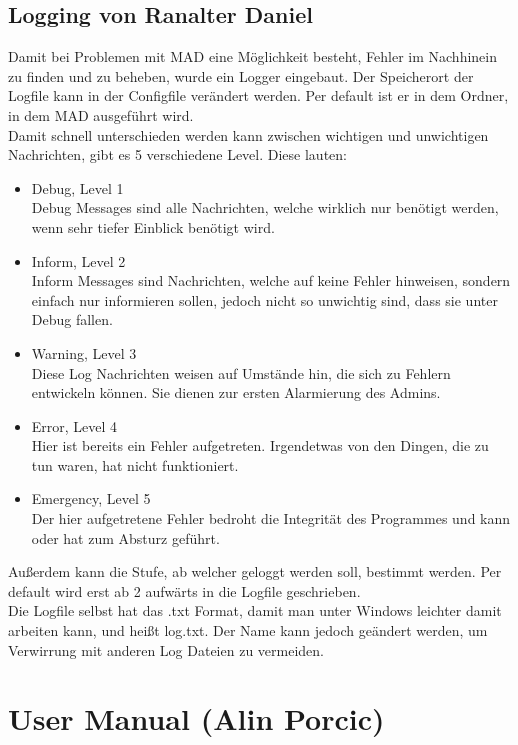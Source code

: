 \documentclass[12pt,a4paper]{report}
\begin{document}
\begin{onehalfspace}

\chapter{Logging von Ranalter Daniel}
Damit bei Problemen mit MAD eine Möglichkeit besteht, Fehler im Nachhinein zu finden und zu beheben, wurde ein Logger eingebaut. Der Speicherort der Logfile kann in der Configfile verändert werden. Per default ist er in dem Ordner, in dem MAD ausgeführt wird.\\
Damit schnell unterschieden werden kann zwischen wichtigen und unwichtigen Nachrichten, gibt es 5 verschiedene \glqq Level\grqq . Diese lauten:
\begin{itemize}
\item Debug, Level 1\\
Debug Messages sind alle Nachrichten, welche wirklich nur benötigt werden, wenn sehr tiefer Einblick benötigt wird. 
\item Inform, Level 2\\
Inform Messages sind Nachrichten, welche auf keine Fehler hinweisen, sondern einfach nur informieren sollen, jedoch nicht so unwichtig sind, dass sie unter Debug fallen.
\item Warning, Level 3\\
Diese Log Nachrichten weisen auf Umstände hin, die sich zu Fehlern entwickeln können. Sie dienen zur ersten Alarmierung des Admins.
\item Error, Level 4\\
Hier ist bereits ein Fehler aufgetreten. Irgendetwas von den Dingen, die zu tun waren, hat nicht funktioniert. 
\item Emergency, Level 5\\
Der hier aufgetretene Fehler bedroht die Integrität des Programmes und kann oder hat zum Absturz geführt. 
\end{itemize}
Außerdem kann die Stufe, ab welcher geloggt werden soll, bestimmt werden. Per default wird erst ab 2 aufwärts in die Logfile geschrieben.\\

Die Logfile selbst hat das .txt Format, damit man unter Windows leichter damit arbeiten kann, und heißt log.txt. Der Name kann jedoch geändert werden, um Verwirrung mit anderen Log Dateien zu vermeiden. 

\part{User Manual (Alin Porcic)}

\end{onehalfspace}
\end{document}
